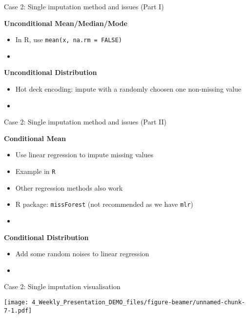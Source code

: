 \documentclass[ignorenonframetext,]{beamer}
\providecommand{\tightlist}{%
  \setlength{\itemsep}{0pt}\setlength{\parskip}{0pt}}
\begin{document}
\begin{frame}[fragile]{Case 2: Single imputation method and issues (Part
I)}

\textbf{Unconditional Mean/Median/Mode}

\begin{itemize}[<+->]
\tightlist
\item
  In R, use \texttt{mean(x,\ na.rm\ =\ FALSE)}
\item
  \color{red}{Issue: Zero variance in imputed values}
\end{itemize}

\textbf{Unconditional Distribution}

\begin{itemize}[<+->]
\tightlist
\item
  Hot deck encoding: impute with a randomly choosen one non-missing
  value
\item
  \color{red}{Issue: less biased variance in imputed values, wrong correlation}
\end{itemize}

\end{frame}

\begin{frame}[fragile]{Case 2: Single imputation method and issues (Part
II)}

\textbf{Conditional Mean}

\begin{itemize}[<+->]
\item
  Use linear regression to impute missing values
\item
  Example in \texttt{R}
\item
  Other regression methods also work
\item
  R package: \texttt{missForest} (not recommended as we have
  \texttt{mlr})
\item
  \color{red}{Issue: wrong conditional variance}
\end{itemize}

\textbf{Conditional Distribution}

\begin{itemize}[<+->]
\tightlist
\item
  Add some random noises to linear regression
\item
  \color{red}{How to generate random noises}
\end{itemize}

\end{frame}

\begin{frame}{Case 2: Single imputation visualisation}

\texttt{[image: 4\_Weekly\_Presentation\_DEMO\_files/figure-beamer/unnamed-chunk-7-1.pdf]}

\end{frame}
\end{document}
